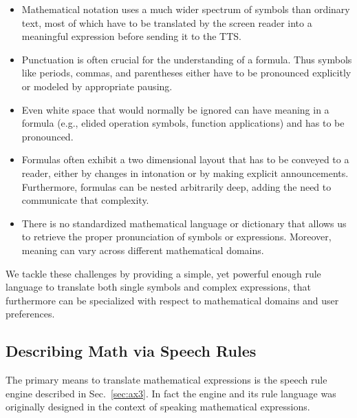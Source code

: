 \documentclass{sig-alternate}
\begin{document}
\begin{itemize}\itemsep-1pt
\item Mathematical notation uses a much wider spectrum of symbols than ordinary
  text, most of which have to be translated by the screen reader into a
  meaningful expression before sending it to the TTS.
\item Punctuation is often crucial for the understanding of a formula. Thus
  symbols like periods, commas, and parentheses either have to be pronounced
  explicitly or modeled by appropriate pausing. 
\item Even white space that would normally be ignored can have meaning in a
  formula (e.g., elided operation symbols, function applications) and has
  to be pronounced.
\item Formulas often exhibit a two dimensional layout that has to be conveyed to
  a reader, either by changes in intonation or by making explicit announcements.
  Furthermore, formulas can be nested arbitrarily deep, adding the need to
  communicate that complexity.
\item There is no standardized mathematical language or dictionary that allows
  us to retrieve the proper pronunciation of symbols or expressions. Moreover,
  meaning can vary across different mathematical domains.
\end{itemize}

We tackle these challenges by providing a simple, yet powerful enough rule
language to translate both single symbols and complex expressions, that
furthermore can be specialized with respect to mathematical domains and user
preferences.

\subsection{Describing Math via Speech Rules}

\newcommand{\srule}[2]{\ensuremath{#1 \rightarrow #2}}
\newcommand{\slist}[1]{\ensuremath{#1}}
\newcommand{\ttrule}[2]{
  
  \noindent\centerline{\texttt{#1}$\rightarrow$\texttt{#2}}}
\newcommand{\tttrule}[2]{

  \noindent
  \texttt{#1}\newline\hspace*{\fill}$\longrightarrow$\texttt{#2}

}
\def\cR{{\cal R}} \def\cN{{\cal N}} \def\assign#1#2{{#1}\leftarrow{#2}} 


The primary means to translate mathematical expressions is the speech rule
engine described in Sec.~\ref{sec:ax3}. In fact the engine and its rule language
was originally designed in the context of speaking mathematical expressions.
\end{document}

